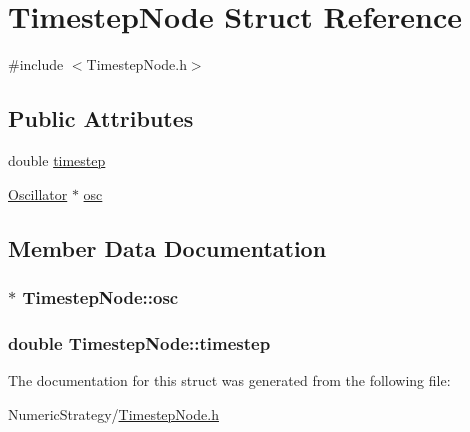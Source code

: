 \hypertarget{struct_timestep_node}{\section{Timestep\+Node Struct Reference}
\label{struct_timestep_node}
}


{\ttfamily \#include $<$Timestep\+Node.\+h$>$}

\subsection*{Public Attributes}
\begin{DoxyCompactItemize}
\item 
double \hyperlink{struct_timestep_node_a596f2f628083ecba5bd61055927e3c1e}{timestep}
\item 
\hyperlink{class_oscillator}{Oscillator} $\ast$ \hyperlink{struct_timestep_node_a7db200fe304dd9587bf2f3e361b49b5b}{osc}
\end{DoxyCompactItemize}


\subsection{Member Data Documentation}
\hypertarget{struct_timestep_node_a7db200fe304dd9587bf2f3e361b49b5b}{
\subsubsection[{osc}]{$\ast$ Timestep\+Node\+::osc}}\label{struct_timestep_node_a7db200fe304dd9587bf2f3e361b49b5b}
\hypertarget{struct_timestep_node_a596f2f628083ecba5bd61055927e3c1e}{
\subsubsection[{timestep}]{\setlength{\rightskip}{0pt plus 5cm}double Timestep\+Node\+::timestep}}\label{struct_timestep_node_a596f2f628083ecba5bd61055927e3c1e}


The documentation for this struct was generated from the following file\+:\begin{DoxyCompactItemize}
\item 
Numeric\+Strategy/\hyperlink{_timestep_node_8h}{Timestep\+Node.\+h}\end{DoxyCompactItemize}
